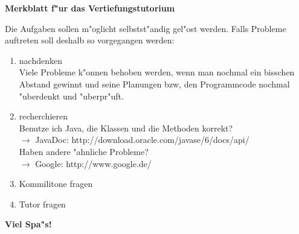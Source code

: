 \documentclass[a4paper]{article}
\begin{document}
\begin{center}
\textbf{\large Merkblatt f"ur das Vertiefungstutorium}
\end{center}

Die Aufgaben sollen m"oglicht selbstst"andig gel"ost werden. Falls Probleme auftreten soll deshalb so vorgegangen werden:
\begin{enumerate}
\item nachdenken\\
Viele Probleme k"onnen behoben werden, wenn man nochmal ein bisschen Abstand gewinnt und seine Planungen bzw, den Programmcode nochmal "uberdenkt und "uberpr"uft.
\item recherchieren\\
Benutze ich Java, die Klassen und die Methoden korrekt?\\
\hspace{4em} $\rightarrow$ JavaDoc: http://download.oracle.com/javase/6/docs/api/\\
Haben andere "ahnliche Probleme?\\
\hspace{4em} $\rightarrow$ Google: http://www.google.de/
\item Kommilitone fragen
\item Tutor fragen
\end{enumerate}
\begin{center}
\textbf{\large Viel Spa"s!}
\end{center}
\end{document}
